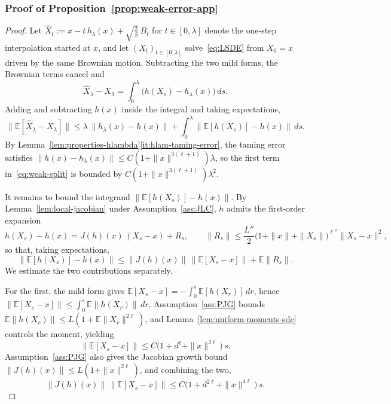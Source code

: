 \documentclass[11pt,a4paper,reqno]{amsart}
\theoremstyle{plain}
\theoremstyle{definition}
\theoremstyle{remark}
\newcommand{\E}{\mathbb{E}}
\begin{document}
\subsubsection{Proof of Proposition~\ref{prop:weak-error-app}}
\label{proof:weak-error}
\begin{proof}
Let $\widehat X_t:=x-t\,h_\lambda(x)+\sqrt{\frac{2}{\beta}}\,B_t$ for $t\in[0,\lambda]$
denote the one-step interpolation started at $x$, and let
$(X_t)_{t\in[0,\lambda]}$ solve~\eqref{eq:LSDE} from $X_0=x$ driven by the same
Brownian motion. Subtracting the two mild forms, the Brownian terms cancel and
\[
  \widehat X_\lambda-X_\lambda
  =
  \int_0^\lambda \bigl(h(X_s)-h_\lambda(x)\bigr)\,ds.
\]
Adding and subtracting $h(x)$ inside the integral and taking expectations,
\begin{equation}\label{eq:weak-split}
  \bigl\|\E[\widehat X_\lambda-X_\lambda]\bigr\|
  \le
  \lambda\,\|h_\lambda(x)-h(x)\|
  +
  \int_{0}^{\lambda}\|\E[h(X_s)]-h(x)\|\,ds.
\end{equation}
By Lemma~\ref{lem:properties-hlambda}\ref{it:hlam-taming-error}, the taming
error satisfies $\|h(x)-h_\lambda(x)\|\le C(1+\|x\|^{3(\ell+1)})\lambda$, so the
first term in~\eqref{eq:weak-split} is bounded by
$C(1+\|x\|^{3(\ell+1)})\lambda^2$.

It remains to bound the integrand $\|\E[h(X_s)]-h(x)\|$. By
Lemma~\ref{lem:local-jacobian} under Assumption~\ref{ass:JLC}, $h$ admits the
first-order expansion
\[
  h(X_s)-h(x)=J(h)(x)\,(X_s-x)+R_s,
  \qquad
  \|R_s\|\le\frac{L''}{2}\bigl(1+\|x\|+\|X_s\|\bigr)^{\ell''}\|X_s-x\|^2,
\]
so that, taking expectations,
\begin{equation}\label{eq:weak-decomp}
  \|\E[h(X_s)]-h(x)\|
  \le
  \|J(h)(x)\|\,\|\E[X_s-x]\|
  +
  \E\|R_s\|.
\end{equation}
We estimate the two contributions separately.

For the first, the mild form gives $\E[X_s-x]=-\int_0^s\E[h(X_r)]\,dr$, hence
$\|\E[X_s-x]\|\le\int_0^s\E\|h(X_r)\|\,dr$. Assumption~\ref{ass:PJG} bounds
$\E\|h(X_r)\|\le L(1+\E\|X_r\|^{2\ell})$, and Lemma~\ref{lem:uniform-moments-sde}
controls the moment, yielding
\[
  \|\E[X_s-x]\|
  \le
  C\bigl(1+d^{\ell}+\|x\|^{2\ell}\bigr)\,s.
\]
Assumption~\ref{ass:PJG} also gives the Jacobian growth bound
$\|J(h)(x)\|\le L(1+\|x\|^{2\ell})$, and combining the two,
\begin{equation}\label{eq:weak-Jacobian-part}
  \|J(h)(x)\|\,\|\E[X_s-x]\|
  \le
  C\bigl(1+d^{2\ell}+\|x\|^{4\ell}\bigr)\,s.
\end{equation}


\end{proof}
\end{document}
